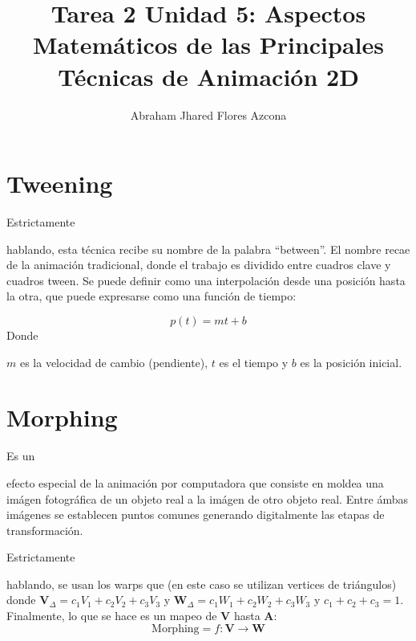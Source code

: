 \documentclass[stu, 12pt, letterpaper, donotrepeattitle, floatsintext, natbib]{apa7}
\title{\Large Tarea 2 Unidad 5: Aspectos Matemáticos de las Principales Técnicas de Animación 2D}
\author{Abraham Jhared Flores Azcona} %
\affiliation{Instituto Tecnológico de Tijuana}
\begin{document}
    \maketitle

    \newpage
    \section{Tweening}
    Estrictamente \begin{justifying}
      hablando, esta técnica recibe su nombre de la palabra ``between''. El nombre recae
      de la animación tradicional, donde el trabajo es dividido entre cuadros clave  y cuadros tween. \citep{penner-no-date} %
      Se puede definir como una interpolación desde una posición hasta la otra, que puede expresarse como una función de tiempo:\par
    \end{justifying}
      \[p(t)=mt+b\]
    Donde \begin{justifying}
      \(m\) es la velocidad de cambio (pendiente), \(t\) es el tiempo y \(b\) es la posición inicial.\par
    \end{justifying}
    \vspace{\baselineskip}
    \section{Morphing}
    Es un \begin{justifying}
      efecto especial de la animación por computadora que consiste en moldea una imágen fotográfica de un objeto real a la imágen
      de otro objeto real. Entre ámbas imágenes se establecen puntos comunes generando digitalmente las etapas de transformación. \citep{prince-2015} %
      \par
    \end{justifying}
    Estrictamente \begin{justifying}
      hablando, se usan los warps que (en este caso se utilizan vertices de triángulos) donde \(\textbf{V}_{\Delta}=c_1V_1+c_2V_2+c_3V_3\) y \(\textbf{W}_{\Delta}=c_1W_1+c_2W_2+c_3W_3\) y \(c_1+c_2+c_3=1\).
      Finalmente, lo que se hace es un mapeo de \(\textbf{V}\) hasta \(\textbf{A}\):
      \[\text{Morphing}= f:\textbf{V}\rightarrow\textbf{W}\]
    \end{justifying}
    \vspace{\baselineskip}
\end{document}
